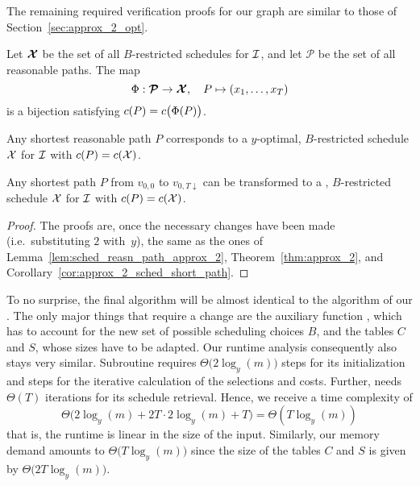 The remaining required verification proofs for our graph are similar to those of Section~\ref{sec:approx_2_opt}.
\begin{lem}\label{lem:sched_reasn_path_approx_y}
Let $\bm{\mathcal{X}}$ be the set of all $B$-restricted schedules for $\mathcal{I}$, and let $\bm{\mathcal{P}}$ be the set of all reasonable paths. The map
\begin{equation*}
	\Phi:\bm{\mathcal{P}}\rightarrow\bm{\mathcal{X}},\quad P\mapsto (x_1,\dotsc,x_T)
\end{equation*}
is a bijection satisfying $c(P)=c\bigl(\Phi(P)\bigr)$.
\end{lem}
\begin{thm}\label{thm:approx_y}
Any shortest reasonable path $P$ corresponds to a $y$-optimal, $B$-restricted schedule $\mathcal{X}$ for $\mathcal{I}$ with $c(P)=c(\mathcal{X})$.
\end{thm} 
\begin{cor}
Any shortest path $P$ from $v_{0,0}$ to $v_{0,T\downarrow}$ can be transformed to a , $B$-restricted schedule $\mathcal{X}$ for $\mathcal{I}$ with $c(P)=c(\mathcal{X})$.
\end{cor}
\begin{proof}
The proofs are, once the necessary changes have been made (i.e.\ substituting $2$ with~$y$), the same as the ones of Lemma~\ref{lem:sched_reasn_path_approx_2}, Theorem~\ref{thm:approx_2}, and Corollary~\ref{cor:approx_2_sched_short_path}.
\end{proof}
To no surprise, the final algorithm will be almost identical to the algorithm of our . The only major things that require a change are the auxiliary function , which has to account for the new set of possible scheduling choices $B$, and the tables $C$ and $S$, whose sizes have to be adapted. Our runtime analysis consequently also stays very similar. Subroutine  requires $\Theta\bigl(2\log_y(m)\bigr)$ steps for its initialization and  steps for the iterative calculation of the selections and costs. Further,  needs $\Theta(T)$ iterations for its schedule retrieval. Hence, we receive a time complexity of
\begin{equation*}
	\Theta\bigl(2\log_y(m)+2T\cdot2\log_y(m)+T\bigr)=\Theta(T\log_y(m))
\end{equation*}
that is, the runtime is linear in the size of the input. Similarly, our memory demand amounts to $\Theta\bigl(T\log_y(m)\bigr)$ since the size of the tables $C$ and $S$ is given by $\Theta\bigl(2T\log_y(m)\bigr)$.

